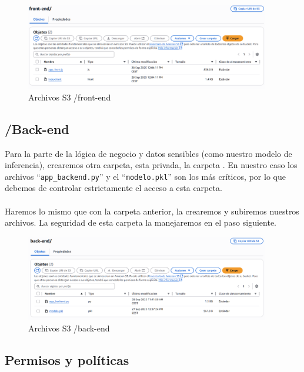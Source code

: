 \documentclass{article}
\begin{document}
	
	\begin{figure}[H]
	\centering
	\includegraphics[width=0.95\textwidth]{archivos_s3_front.png}
	\caption{Archivos S3 /front-end}
	\end{figure}

	\subsection{/Back-end}

	Para la parte de la lógica de negocio y datos sensibles (como nuestro modelo de inferencia), crearemos otra carpeta, esta privada, la carpeta . En nuestro caso los archivos ``\verb|app_backend.py|'' y el ``\verb|modelo.pkl|'' son los más críticos, por lo que debemos de controlar estrictamente el acceso a esta carpeta. 
	\\\\
	Haremos lo mismo que con la carpeta anterior, la crearemos y subiremos nuestros archivos. La seguridad de esta carpeta la manejaremos en el paso siguiente.


	
	\begin{figure}[H]
	\centering
	\includegraphics[width=0.95\textwidth]{archivos_s3_bck.png}
	\caption{Archivos S3 /back-end}
	\end{figure}

	\subsection{Permisos y políticas}
\end{document}
